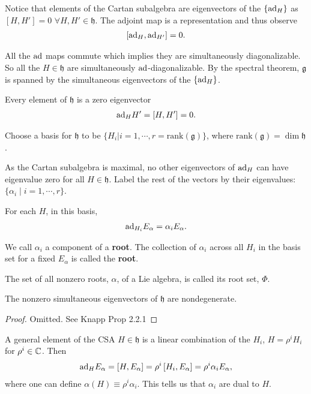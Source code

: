 
Notice that elements of the Cartan subalgebra are eigenvectors of the $\{\text{ad}_H\} $ as $\left[ H, H' \right] = 0$ $\forall H, H' \in \mathfrak{h}$. The adjoint map is a representation and thus observe
\begin{align}
    \left[ \text{ad}_H, \text{ad}_{H'} \right] = 0
.\end{align}

All the $\text{ad}$ maps commute which implies they are simultaneously diagonalizable. So all the $H \in \mathfrak{h}$ are simultaneously $\text{ad}$-diagonalizable. By the spectral theorem, $\mathfrak{g}$ is spanned by the simultaneous eigenvectors of the $\{\text{ad}_H\}$.

Every element of $\mathfrak{h}$ is a zero eigenvector
\begin{align}
    \text{ad}_H H' = \left[ H, H' \right] = 0
.\end{align}

Choose a basis for $\mathfrak{h}$ to be $\{H_{i} | i=1,\cdots,r=\text{rank}\left( \mathfrak{g} \right) \} $, where $\text{rank}\left( \mathfrak{g} \right) = \dim \mathfrak{h}$.

As the Cartan subalgebra is maximal, no other eigenvectors of $\text{ad}_H$ can have eigenvalue zero for all $H \in \mathfrak{h}$. Label the rest of the vectors by their eigenvalues: $\{\alpha_i  \mid i = 1 , \cdots, r \} $.

For each $H$, in this basis,
\begin{align}
    \text{ad}_{H_{i}} E_\alpha = \alpha_i E_\alpha
.\end{align}

We call $\alpha_i$ a component of a \textbf{root}. The collection of $\alpha_i$ across all $H_i$ in the basis set for a fixed $E_\alpha$ is called the \textbf{root}.

\begin{definition}
    The set of all nonzero roots, $\alpha$, of a Lie algebra, is called its root set, $\Phi$.
\end{definition}

\begin{proposition}
    The nonzero simultaneous eigenvectors of $\mathfrak{h}$ are nondegenerate.
\end{proposition}

\begin{proof}
    Omitted. See Knapp Prop 2.2.1
\end{proof}

A general element of the CSA $H \in \mathfrak{h}$ is a linear combination of the $H_{i}$, $H = \rho^{i} H_{i}$ for $\rho^{i} \in \mathbb{C}$. Then
\begin{align}
    \text{ad}_H E_\alpha = \left[ H, E_\alpha \right] = \rho^{i} \left[ H_i, E_\alpha \right] = \rho^{i} \alpha_i E_\alpha
,\end{align}
where one can define $\alpha \left( H \right) \equiv \rho^{i} \alpha_i$. This tells us that $\alpha_i$ are dual to $H$.

